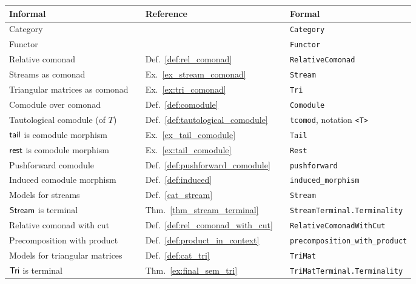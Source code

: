 

{


\begin{center}
{\renewcommand{\arraystretch}{1.2}
\begin{tabular}{lllll}
Informal && Reference && Formal \\ \hline
Category &&  && \lstinline!Category!\\
Functor &&  && \lstinline!Functor!\\
Relative comonad && Def.\ \ref{def:rel_comonad} && \lstinline!RelativeComonad!\\
Streams as comonad && Ex.\ \ref{ex_stream_comonad} && \lstinline!Stream!\\
Triangular matrices as comonad && Ex.\ \ref{ex:tri_comonad} && \lstinline!Tri!\\
Comodule over comonad && Def.\ \ref{def:comodule} && \lstinline!Comodule!\\
Tautological comodule (of $T$) && Def.\ \ref{def:tautological_comodule} &&\lstinline!tcomod!, notation \lstinline!<T>!\\
$\mathsf{tail}$ is comodule morphism && Ex.\ \ref{ex_tail_comodule}&& \lstinline!Tail!\\
$\mathsf{rest}$ is comodule morphism && Ex.\ \ref{ex:tail_comodule} && \lstinline!Rest!\\
Pushforward comodule && Def.\ \ref{def:pushforward_comodule} && \lstinline!pushforward!\\
Induced comodule morphism && Def.\ \ref{def:induced} && \lstinline!induced_morphism!\\
Models for streams    && Def.\ \ref{cat_stream} && \lstinline!Stream!\\
$\mathsf{Stream}$ is terminal && Thm.\ \ref{thm_stream_terminal} && \lstinline!StreamTerminal.Terminality!\\
Relative comonad with cut && Def.\ \ref{def:rel_comonad_with_cut} && \lstinline!RelativeComonadWithCut!\\
Precomposition with product && Def.\ \ref{def:product_in_context} &&\lstinline!precomposition_with_product!\\
Models for triangular matrices && Def.\ \ref{def:cat_tri} && \lstinline!TriMat!\\
$\mathsf{Tri}$ is terminal && Thm.\ \ref{ex:final_sem_tri} && \lstinline!TriMatTerminal.Terminality!\\
\end{tabular}
}
\end{center}


}
